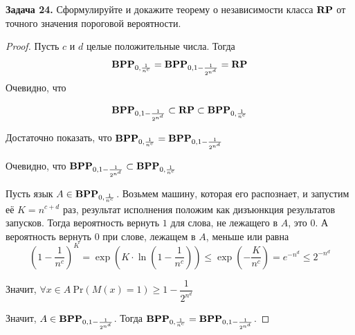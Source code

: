 \textbf{Задача 24.} Сформулируйте и докажите теорему о независимости класса $\textbf{RP}$ от точного значения пороговой вероятности.

\begin{proof}
Пусть $c$ и $d$ целые положительные числа. Тогда
\[\textbf{BPP}_{0,\frac{1}{n^c}}=\textbf{BPP}_{0,1 - \frac{1}{2^{n^d}}}=\textbf{RP}\]
Очевидно, что

\[\textbf{BPP}_{0,1 - \frac{1}{2^{n^d}}}\subset\textbf{RP}\subset\textbf{BPP}_{0,\frac{1}{n^c}}\]

Достаточно показать, что $\textbf{BPP}_{0,\frac{1}{n^c}}=\textbf{BPP}_{0,1 - \frac{1}{2^{n^d}}}$

Очевидно, что $\textbf{BPP}_{0,1 - \frac{1}{2^{n^d}}}\subset\textbf{BPP}_{0,\frac{1}{n^c}}$

Пусть язык $A\in\textbf{BPP}_{0,\frac{1}{n^c}}$.
Возьмем машину, которая его распознает, и запустим её $K=n^{c+d}$ раз, результат исполнения положим как дизъюнкция результатов запусков. Тогда вероятность вернуть $1$ для слова, не лежащего в $A$, это $0$. А вероятность вернуть $0$ при слове, лежащем в $A$, меньше или равна
\[
\left(1-\frac{1}{n^c}\right)^K = \exp\left(K\cdot \ln{\left(1 - \frac{1}{n^c}\right)}\right) \le \exp\left(-\frac{K}{n^c}\right) = e^{-n^d} \le 2^{-n^d}
\]

Значит, $\forall x \in A\ \mathrm{Pr}(M(x)=1) \ge 1 - \dfrac{1}{2^{n^d}}$

Значит, $A\in\textbf{BPP}_{0,1 - \frac{1}{2^{n^d}}}$. Тогда $\textbf{BPP}_{0,\frac{1}{n^c}}=\textbf{BPP}_{0,1 - \frac{1}{2^{n^d}}}$. \end{proof}